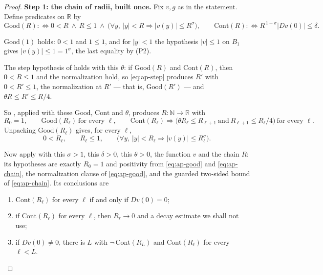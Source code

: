 \begin{proof}
\medskip\noindent\textbf{Step 1: the chain of radii, built once.}
Fix $v,g$ as in the statement.  Define predicates on $\mathbb{R}$ by
\[
  \mathrm{Good}(R):\iff 0<R\ \wedge\ R\le1\ \wedge\
    \bigl(\forall y,\ \lvert y\rvert<R\Rightarrow\lvert v(y)\rvert\le R^{\sigma}\bigr),
  \qquad
  \mathrm{Cont}(R):\iff R^{\,1-\sigma}\lvert Dv(0)\rvert\le\delta .
\]

$\mathrm{Good}(1)$ holds: $0<1$ and $1\le1$, and for $\lvert y\rvert<1$ the hypothesis
$\lvert v\rvert\le1$ on $B_1$ gives $\lvert v(y)\rvert\le1=1^{\sigma}$, the last equality
by (P2).

The step hypothesis of  holds with this $\theta$: if
$\mathrm{Good}(R)$ and $\mathrm{Cont}(R)$, then $0<R\le1$ and the normalization hold, so
\eqref{eq:ap-step} produces $R'$ with $0<R'\le1$, the normalization at $R'$ --- that is,
$\mathrm{Good}(R')$ --- and $\theta R\le R'\le R/4$.

So , applied with these $\mathrm{Good}$, $\mathrm{Cont}$ and
$\theta$, produces $R\colon\mathbb{N}\to\mathbb{R}$ with
\begin{equation}\label{eq:ap-chain}
  R_0=1,\qquad \mathrm{Good}(R_\ell)\ \text{for every }\ell,\qquad
  \mathrm{Cont}(R_\ell)\Rightarrow\bigl(\theta R_\ell\le R_{\ell+1}
    \ \text{and}\ R_{\ell+1}\le R_\ell/4\bigr)\ \text{for every }\ell .
\end{equation}
Unpacking $\mathrm{Good}(R_\ell)$ gives, for every $\ell$,
\begin{equation}\label{eq:ap-good}
  0<R_\ell,\qquad R_\ell\le1,\qquad
  \bigl(\forall y,\ \lvert y\rvert<R_\ell\Rightarrow\lvert v(y)\rvert\le R_\ell^{\sigma}\bigr).
\end{equation}

Now apply  with this $\sigma>1$, this $\delta>0$, this $\theta>0$,
the function $v$ and the chain $R$: its hypotheses are exactly $R_0=1$ and positivity from
\eqref{eq:ap-good} and \eqref{eq:ap-chain}, the normalization clause of \eqref{eq:ap-good}, and
the guarded two-sided bound of \eqref{eq:ap-chain}.  Its conclusions are
\begin{enumerate}
\item[(D1)] $\mathrm{Cont}(R_\ell)$ for every $\ell$ if and only if $Dv(0)=0$;
\item[(D2)] if $\mathrm{Cont}(R_\ell)$ for every $\ell$, then $R_\ell\to0$ and a decay estimate
  we shall not use;
\item[(D3)] if $Dv(0)\ne0$, there is $L$ with $\neg\,\mathrm{Cont}(R_L)$ and
  $\mathrm{Cont}(R_\ell)$ for every $\ell<L$.
\end{enumerate}


\end{proof}
